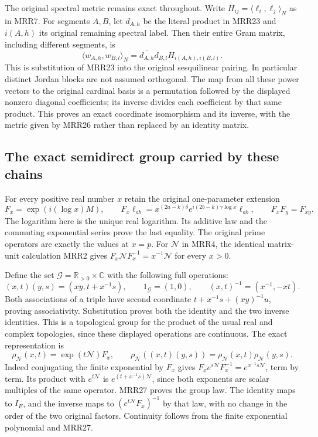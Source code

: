 The original spectral metric remains exact throughout.
Write $H_{ij}=\langle\ell_i,\ell_j\rangle_N$ as in MRR7.
For segments $A,B$, let $d_{A,h}$ be the literal product
in MRR23 and $i(A,h)$ its original remaining spectral label.
Then their entire Gram matrix, including different segments,
is
\[
\boxed{
\langle w_{A,h},w_{B,l}\rangle_N
=\overline{d_{A,h}}d_{B,l}H_{i(A,h),i(B,l)}.}
\tag{MRR26}
\]
This is substitution of MRR23 into the original sesquilinear
pairing. In particular distinct Jordan blocks are not assumed
orthogonal. The map from all these power vectors to the
original cardinal basis is a permutation followed by the
displayed nonzero diagonal coefficients; its inverse divides
each coefficient by that same product. This proves an exact
coordinate isomorphism and its inverse, with the metric given
by MRR26 rather than replaced by an identity matrix.

\subsection{The exact semidirect group carried by these chains}

For every positive real number $x$ retain the original
one-parameter extension
\[
F_x=\exp(i(\log x)M),\qquad
F_x\ell_{ab}=
x^{(2a-k)\delta}e^{i(2b-k)\gamma\log x}\ell_{ab},
\qquad F_xF_y=F_{xy}.
\tag{MRR27}
\]
The logarithm here is the unique real logarithm.
Its additive law and the commuting exponential series prove
the last equality. The original prime operators are exactly
the values at $x=p$.
For $\mathcal N$ in MRR4, the identical matrix-unit
calculation MRR2 gives
$F_x\mathcal NF_x^{-1}=x^{-1}\mathcal N$ for every $x>0$.

Define the set $\mathcal G=\mathbb R_{>0}\times\mathbb C$
with the following full operations:
\[
(x,t)(y,s)=(xy,t+x^{-1}s),\qquad
1_{\mathcal G}=(1,0),\qquad
(x,t)^{-1}=(x^{-1},-xt).
\tag{MRR28}
\]
Both associations of a triple have second coordinate
$t+x^{-1}s+(xy)^{-1}u$, proving associativity.
Substitution proves both the identity and the two inverse
identities. This is a topological group for the product
of the usual real and complex topologies, since these
displayed operations are continuous.
The exact representation is
\[
\boxed{
\rho_{\mathcal N}(x,t)=\exp(t\mathcal N)F_x,
\qquad
\rho_{\mathcal N}((x,t)(y,s))
=\rho_{\mathcal N}(x,t)\rho_{\mathcal N}(y,s).}
\tag{MRR29}
\]
Indeed conjugating the finite exponential by $F_x$ gives
$F_xe^{s\mathcal N}F_x^{-1}=e^{x^{-1}s\mathcal N}$,
term by term. Its product with $e^{t\mathcal N}$ is
$e^{(t+x^{-1}s)\mathcal N}$, since both exponents are scalar
multiples of the same operator. MRR27 proves the group law.
The identity maps to $I_E$, and the inverse maps to
$(e^{t\mathcal N}F_x)^{-1}$ by that law, with no change in
the order of the two original factors. Continuity follows
from the finite exponential polynomial and MRR27.

